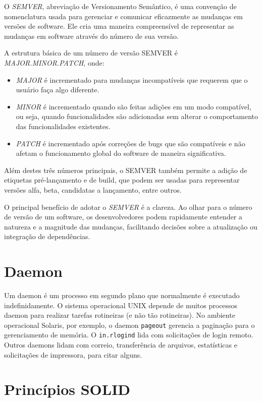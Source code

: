 \documentclass[12pt, %
openright, 
oneside, %
a4paper,    %
brazil]{facom-ufu-abntex2}
\begin{document}
O \textit{SEMVER}, abreviação de Versionamento Semântico, é uma convenção de
nomenclatura usada para gerenciar e comunicar eficazmente as mudanças em
versões de software. Ele cria uma maneira compreensível de representar as
mudanças em software através do número de sua versão.

A estrutura básica de um número de versão SEMVER é \textit{MAJOR.MINOR.PATCH},
onde:

\begin{itemize}
	\item \textit{MAJOR} é incrementado para mudanças incompatíveis que requerem que o usuário faça algo diferente.
	\item \textit{MINOR} é incrementado quando são feitas adições em um modo compatível, ou seja, quando funcionalidades são adicionadas sem alterar o comportamento das funcionalidades existentes.
	\item \textit{PATCH} é incrementado após correções de bugs que são compatíveis e não afetam o funcionamento global do software de maneira significativa.
\end{itemize}

Além destes três números principais, o SEMVER também permite a adição de
etiquetas pré-lançamento e de build, que podem ser usadas para representar
versões alfa, beta, candidatas a lançamento, entre outros.

O principal benefício de adotar o \textit{SEMVER} é a clareza. Ao olhar para o
número de versão de um software, os desenvolvedores podem rapidamente entender
a natureza e a magnitude das mudanças, facilitando decisões sobre a atualização
ou integração de dependências. \cite{semver}

\section{Daemon}

Um daemon é um processo em segundo plano que normalmente é executado
indefinidamente. O sistema operacional UNIX depende de muitos processos daemon
para realizar tarefas rotineiras (e não tão rotineiras). No ambiente
operacional Solaris, por exemplo, o daemon \texttt{pageout} gerencia a
paginação para o gerenciamento de memória. O \texttt{in.rlogind} lida com
solicitações de login remoto. Outros daemons lidam com correio, transferência
de arquivos, estatísticas e solicitações de impressora, para citar alguns.
\cite{kay2004unix}

\section{Princípios SOLID}
\end{document}
